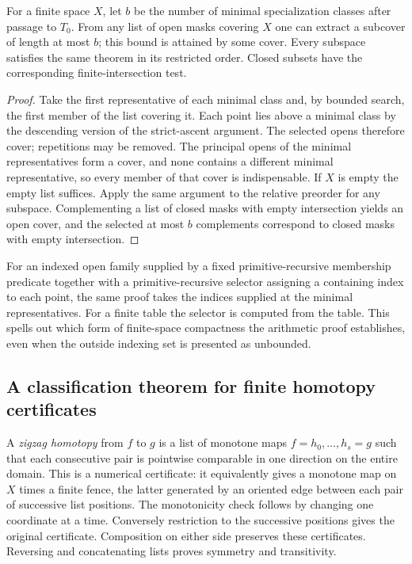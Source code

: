 \begin{proposition}\label{idx-finite389}
For a finite space $X$, let $b$ be the number of minimal specialization
classes after passage to $T_0$. From any list of open masks covering $X$ one
can extract a subcover of length at most $b$; this bound is attained by
some cover. Every subspace satisfies the same theorem in its restricted
order. Closed subsets have the corresponding finite-intersection test.
\end{proposition}
\begin{proof}
Take the first representative of each minimal class and, by bounded search,
the first member of the list covering it. Each point lies above a minimal
class by the descending version of the strict-ascent argument. The selected
opens therefore cover; repetitions may be removed. The principal opens of
the minimal representatives form a cover, and none contains a different
minimal representative, so every member of that cover is indispensable.
If $X$ is empty the empty list suffices. Apply the same argument to the
relative preorder for any subspace. Complementing a list of closed masks
with empty intersection yields an open cover, and the selected at most
$b$ complements correspond to closed masks with empty intersection.
\end{proof}

For an indexed open family supplied by a fixed primitive-recursive
membership predicate together with a primitive-recursive selector assigning
a containing index to each point, the same proof takes the indices supplied
at the minimal representatives. For a finite table the selector is computed
from the table. This spells out which form of finite-space compactness
the arithmetic proof establishes, even when the outside indexing set is
presented as unbounded.

\subsection{A classification theorem for finite homotopy certificates}

A \emph{zigzag homotopy} from $f$ to $g$ is a list of monotone maps
$f=h_0,\ldots,h_s=g$ such that each consecutive pair is pointwise
comparable in one direction on the entire domain. This is a numerical
certificate: it equivalently gives a monotone map on $X$ times a finite
fence, the latter generated by an oriented edge between each pair of
successive list positions. The monotonicity check follows by changing
one coordinate at a time. Conversely restriction to the successive positions
gives the original certificate. Composition on either side preserves these
certificates. Reversing and concatenating lists proves symmetry and
transitivity.

